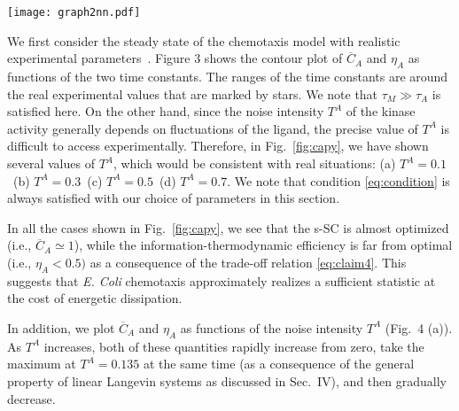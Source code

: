 \documentclass[%
 reprint,
 amsmath,amssymb,
 aps,
]{revtex4-1}
\newcommand{\fref}[1]{Fig.~\ref{fig:#1}}
\theoremstyle{plain}
\begin{document}
\begin{figure*}[htbp]
\texttt{[image: graph2nn.pdf]}
\caption{\label{fig:graph2}(a) The s-SC $\overline{C}_A$ (blue line) and the information-thermodynamic efficiency $\eta_A$ (orange line) against the noise intensity $T^A$. The optimal noise intensity, at which $\overline{C}_A$ and $\eta_A$ take the maximum value, is indicated by the black bold line. (b) The dotted line represents the trade-off relation \eqref{eq:claim4} between $\overline{C}_A$ and $\eta_A$ in the present setup. The cases of $T^A=0.135$ (black), $T^A=0.7$ (blue), $T^A=0.9$ (red) are indicated by the colored circles, where $T^A=0.135$ (black) is the optimal noise intensity. (c) The entropy productions of the subsystems ($\sigma_M$ and $\sigma_A$) and that of the total system ($\sigma_{\rm tot}$). The noise intensity at which the total entropy production takes the minimum value is indicated by the black bold line. The other parameters are the same as in Fig.~\ref{fig:capy}. } 
\end{figure*}

We first consider the steady state of the chemotaxis model with realistic experimental parameters~\cite{Tu2008,Emonet2008,Tostevin2009,Lan2012}. Figure 3 shows the contour plot of $\overline{C}_A$ and $\eta_A$ as functions of the two time constants. The ranges of the time constants are around the real experimental values that are marked by stars. We note that  $\tau_M\gg \tau_A$ is satisfied here. On the other hand, since the noise intensity $T^A$ of the kinase activity generally depends on fluctuations of the ligand, the precise value of $T^A$ is difficult to access experimentally. Therefore, in \fref{capy}, we have shown several values of $T^A$, which would be consistent with real situations: (a) $T^A=0.1$\ (b) $T^A=0.3$\ (c) $T^A=0.5$\ (d) $T^A=0.7$. We note that condition \eqref{eq:condition} is always satisfied with our choice of parameters in this section.

In all the cases shown in \fref{capy}, we see that the s-SC is almost optimized (i.e., $\overline{C}_A \simeq 1$), while the information-thermodynamic efficiency is far from optimal (i.e., $\eta_A < 0.5)$ as a consequence of the trade-off relation \eqref{eq:claim4}. This suggests that {\it E. Coli} chemotaxis approximately realizes a sufficient statistic at the cost of energetic dissipation.

In addition, we plot $\overline{C}_A$ and $\eta_A$ as functions of  the noise intensity $T^A$ (Fig.~4 (a)). As $T^A$ increases, both of these quantities rapidly increase from zero, take the maximum at $T^A=0.135$ at the same time (as a consequence of the general property of linear Langevin systems as discussed in Sec.~IV), and then gradually decrease.
\end{document}
